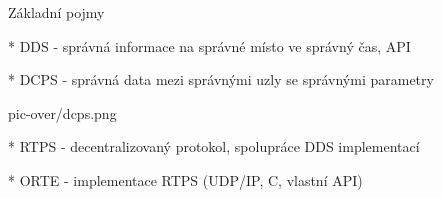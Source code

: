 \sec Základní pojmy

* DDS - správná informace na správné místo ve správný čas, API

* DCPS - správná data mezi správnými uzly se správnými parametry \nl

\centerline{\picw=14cm \inspic pic-over/dcps.png }

* RTPS - decentralizovaný protokol, spolupráce DDS implementací

* ORTE - implementace RTPS (UDP/IP, C, vlastní API)

